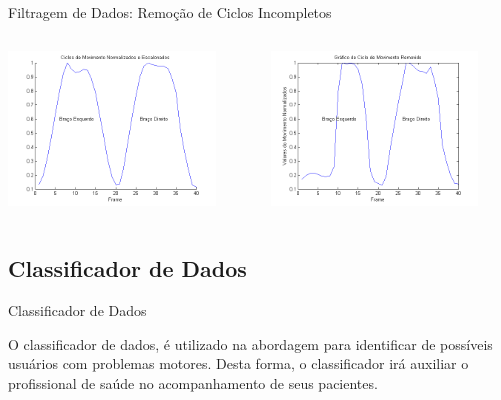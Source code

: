 \documentclass{beamer}
\begin{document}
\begin{frame}{Filtragem de Dados: Remoção de Ciclos Incompletos}
   \begin{block}{}
   
   \begin{columns}[c]
     \begin{column}{0.5\linewidth}
				\includegraphics[width=5.5cm]{img/ciclonormalizadoescalonado.png}
     \end{column}

     \begin{column}{0.55\linewidth}
				\includegraphics[width=5.5cm]{img/ciclomovimentoremovido.png}
    \end{column}
\end{columns}
\end{block}
\end{frame}

\subsection{Classificador de Dados}
\begin{frame}{Classificador de Dados}
\begin{block}{}
			O classificador de dados, é utilizado na abordagem para identificar de possíveis usuários com problemas motores. Desta forma, o classificador irá auxiliar o profissional de saúde no acompanhamento de seus pacientes.
\end{block}
\end{frame}
\end{document}
